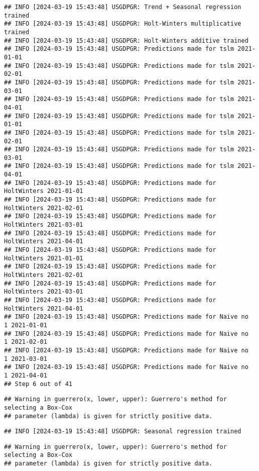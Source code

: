 \documentclass[
]{article}
\begin{document}
\begin{verbatim}
## INFO [2024-03-19 15:43:48] USGDPGR: Trend + Seasonal regression trained
## INFO [2024-03-19 15:43:48] USGDPGR: Holt-Winters multiplicative trained
## INFO [2024-03-19 15:43:48] USGDPGR: Holt-Winters additive trained
## INFO [2024-03-19 15:43:48] USGDPGR: Predictions made for tslm 2021-01-01
## INFO [2024-03-19 15:43:48] USGDPGR: Predictions made for tslm 2021-02-01
## INFO [2024-03-19 15:43:48] USGDPGR: Predictions made for tslm 2021-03-01
## INFO [2024-03-19 15:43:48] USGDPGR: Predictions made for tslm 2021-04-01
## INFO [2024-03-19 15:43:48] USGDPGR: Predictions made for tslm 2021-01-01
## INFO [2024-03-19 15:43:48] USGDPGR: Predictions made for tslm 2021-02-01
## INFO [2024-03-19 15:43:48] USGDPGR: Predictions made for tslm 2021-03-01
## INFO [2024-03-19 15:43:48] USGDPGR: Predictions made for tslm 2021-04-01
## INFO [2024-03-19 15:43:48] USGDPGR: Predictions made for HoltWinters 2021-01-01
## INFO [2024-03-19 15:43:48] USGDPGR: Predictions made for HoltWinters 2021-02-01
## INFO [2024-03-19 15:43:48] USGDPGR: Predictions made for HoltWinters 2021-03-01
## INFO [2024-03-19 15:43:48] USGDPGR: Predictions made for HoltWinters 2021-04-01
## INFO [2024-03-19 15:43:48] USGDPGR: Predictions made for HoltWinters 2021-01-01
## INFO [2024-03-19 15:43:48] USGDPGR: Predictions made for HoltWinters 2021-02-01
## INFO [2024-03-19 15:43:48] USGDPGR: Predictions made for HoltWinters 2021-03-01
## INFO [2024-03-19 15:43:48] USGDPGR: Predictions made for HoltWinters 2021-04-01
## INFO [2024-03-19 15:43:48] USGDPGR: Predictions made for Naive no  1 2021-01-01
## INFO [2024-03-19 15:43:48] USGDPGR: Predictions made for Naive no  1 2021-02-01
## INFO [2024-03-19 15:43:48] USGDPGR: Predictions made for Naive no  1 2021-03-01
## INFO [2024-03-19 15:43:48] USGDPGR: Predictions made for Naive no  1 2021-04-01
## Step 6 out of 41
\end{verbatim}

\begin{verbatim}
## Warning in guerrero(x, lower, upper): Guerrero's method for selecting a Box-Cox
## parameter (lambda) is given for strictly positive data.
\end{verbatim}

\begin{verbatim}
## INFO [2024-03-19 15:43:48] USGDPGR: Seasonal regression trained
\end{verbatim}

\begin{verbatim}
## Warning in guerrero(x, lower, upper): Guerrero's method for selecting a Box-Cox
## parameter (lambda) is given for strictly positive data.
\end{verbatim}
\end{document}
